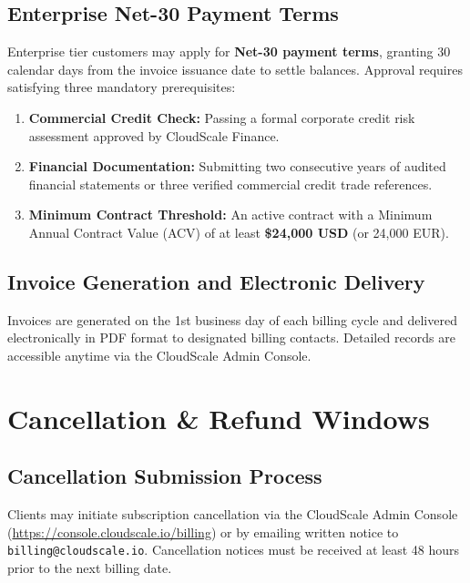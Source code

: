 \documentclass[10pt,letterpaper]{article}
\begin{document}
\subsection{Enterprise Net-30 Payment Terms}
Enterprise tier customers may apply for \textbf{Net-30 payment terms}, granting 30 calendar days from the invoice issuance date to settle balances. Approval requires satisfying three mandatory prerequisites:
\begin{enumerate}[label=(\alph*)]
  \item \textbf{Commercial Credit Check:} Passing a formal corporate credit risk assessment approved by CloudScale Finance.
  \item \textbf{Financial Documentation:} Submitting two consecutive years of audited financial statements or three verified commercial credit trade references.
  \item \textbf{Minimum Contract Threshold:} An active contract with a Minimum Annual Contract Value (ACV) of at least \textbf{\$24,000 USD} (or 24,000 EUR).
\end{enumerate}

\subsection{Invoice Generation and Electronic Delivery}
Invoices are generated on the 1st business day of each billing cycle and delivered electronically in PDF format to designated billing contacts. Detailed records are accessible anytime via the CloudScale Admin Console.

\vspace{3pt}

\section{Cancellation \& Refund Windows}

\subsection{Cancellation Submission Process}
Clients may initiate subscription cancellation via the CloudScale Admin Console (\url{https://console.cloudscale.io/billing}) or by emailing written notice to \texttt{billing@cloudscale.io}. Cancellation notices must be received at least 48 hours prior to the next billing date.
\end{document}
